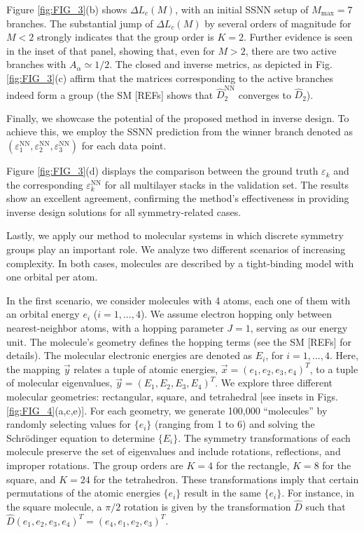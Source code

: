 Figure \ref{fig:FIG_3}(b) shows $\Delta L_c (M)$, with an initial SSNN setup of $M_{\mathrm{max}}= 7$ branches.  The substantial jump of $\Delta L_c (M)$ by several orders of magnitude for $M<2$ strongly indicates that the group order is $K=2$.  Further evidence is seen in the inset of that panel,  showing that, even for $M>2$, there are two active branches with $A_{\alpha} \simeq 1/2$.  The closed and inverse metrics, as depicted in Fig. \ref{fig:FIG_3}(c) affirm that the matrices corresponding to the active branches indeed form a group (the SM [REFs] shows that $\hat{D}_{2}^{\mathrm{NN}}$ converges to $\hat{D}_{2}$). 
%

Finally, we showcase the potential of the proposed method in inverse design. To achieve this, we employ the SSNN prediction from the winner branch denoted as $(\varepsilon_1^{\mathrm{NN}}, \varepsilon_2^{\mathrm{NN}}, \varepsilon_3^{\mathrm{NN}})$ for each data point.

Figure \ref{fig:FIG_3}(d) displays the comparison between the ground truth $\varepsilon_{k}$ and the corresponding $\varepsilon_{k}^{\mathrm{NN}}$ for all multilayer stacks in the validation set.  The results show an excellent agreement, confirming the method's effectiveness in providing inverse design solutions for all symmetry-related cases.


Lastly, we apply our method to molecular systems in which discrete symmetry groups play an important role. We analyze two different scenarios of increasing complexity. In both cases, molecules are described by a tight-binding model with one orbital per atom.

In the first scenario, we consider molecules with 4 atoms, each one of them with an orbital energy $e_i$ ($i=1,...,4$).  We assume electron hopping only between nearest-neighbor atoms, with a hopping parameter $J=1$, serving as our energy unit. The molecule's geometry defines the hopping terms (see the SM [REFs] for details). The molecular electronic energies are denoted as $E_i$, for $i=1,...,4$. Here, the mapping $\vec{y}$ relates a tuple of atomic energies, $\vec{x} = (e_1,e_2,e_3,e_4)^T$, to a tuple of molecular eigenvalues, $\vec{y} = (E_1,E_2,E_3,E_4)^T$. 
%
We explore three different molecular geometries: rectangular, square, and tetrahedral [see insets in Figs. \ref{fig:FIG_4}(a,c,e)]. 
For each geometry, we generate 100,000 ``molecules'' by randomly selecting values for $\{e_{i}\}$ (ranging from 1 to 6) and solving the Schr\"odinger equation to determine $\{E_{i}\}$. 
The symmetry transformations of each molecule preserve the set of eigenvalues and include rotations, reflections, and improper rotations. The group orders are $K = 4$ for the rectangle, $K = 8$ for the square, and $K = 24$ for the tetrahedron. These transformations imply that certain permutations of the atomic energies $\{e_{i}\}$ result in the same $\{e_{i}\}$. For instance, in the square molecule, a $\pi / 2$ rotation is given by the transformation $\hat{D}$ such that $\hat{D}(e_1,e_2,e_3,e_4)^T = (e_4,e_1,e_2,e_3)^T$. 

